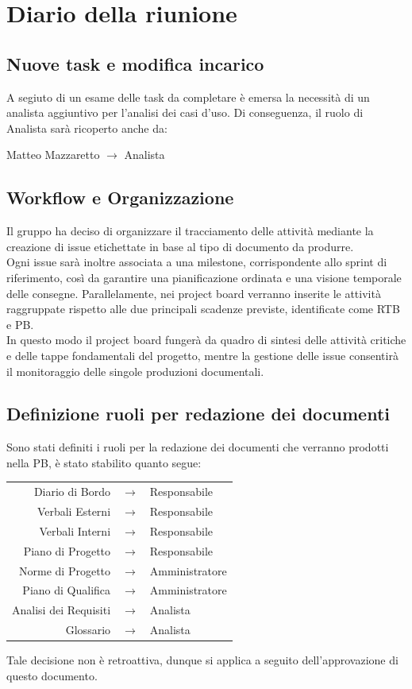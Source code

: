 \section{Diario della riunione}
\subsection{Nuove task e modifica incarico}
A segiuto di un esame delle task da completare è emersa la necessità di un analista aggiuntivo per l’analisi dei casi d’uso. Di conseguenza, il ruolo di Analista sarà ricoperto anche da:
\begin{center}
Matteo Mazzaretto $\rightarrow$ Analista
\end{center}

\subsection{Workflow e Organizzazione}
Il gruppo ha deciso di organizzare il tracciamento delle attività mediante la creazione di issue etichettate in base al tipo di documento da produrre. \\
Ogni issue sarà inoltre associata a una milestone, corrispondente allo sprint di riferimento, così da garantire una pianificazione ordinata e una visione temporale delle consegne. Parallelamente, nei project board verranno inserite le attività raggruppate rispetto alle due principali scadenze previste, identificate come RTB e PB.\\
In questo modo il project board fungerà da quadro di sintesi delle attività critiche e delle tappe fondamentali del progetto, mentre la gestione delle issue consentirà il monitoraggio delle singole produzioni documentali.

\subsection{Definizione ruoli per redazione dei documenti}
Sono stati definiti i ruoli per la redazione dei documenti che verranno prodotti nella PB, è stato stabilito quanto segue: 
\begin{center}
\begin{tabular}{r c l}
Diario di Bordo & $\rightarrow$ & Responsabile \\
Verbali Esterni & $\rightarrow$ & Responsabile \\
Verbali Interni & $\rightarrow$ & Responsabile \\
Piano di Progetto & $\rightarrow$ & Responsabile \\
Norme di Progetto & $\rightarrow$ & Amministratore \\
Piano di Qualifica & $\rightarrow$ & Amministratore \\
Analisi dei Requisiti & $\rightarrow$ & Analista \\
Glossario & $\rightarrow$ & Analista \\
\end{tabular}
\end{center}

Tale decisione non è retroattiva, dunque si applica a seguito dell'approvazione di questo documento.